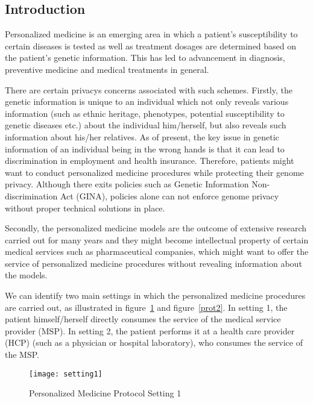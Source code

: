\documentclass[10pt,letterpaper]{article}
\begin{document}
\begin{multicols}{2} %

\section{Introduction}
Personalized medicine is an emerging area in which a patient's susceptibility to certain diseases is tested as well as treatment dosages are determined 
based on the patient's genetic information. This has led to advancement in diagnosis, preventive medicine and medical treatments in general. 

There are certain privacys concerns associated with such schemes. Firstly, the genetic information is unique to an individual which not only reveals various 
information (such as ethnic heritage, phenotypes, potential susceptibility to genetic diseases etc.) about the individual him/herself, but also reveals such
information about his/her relatives. As of present, the key issue in genetic information of an individual being in the wrong hands is that it can lead to 
discrimination in employment and health insurance. Therefore, patients might want to conduct personalized medicine procedures while
protecting their genome privacy. Although there exits policies such as Genetic Information Non-discrimination Act (GINA), policies alone 
can not enforce genome privacy without proper technical solutions in place. 

Secondly, the personalized medicine models are the outcome of extensive research carried out for many years and they might become intellectual property of 
certain medical services such as pharmaceutical companies, which might want to offer the service of personalized medicine procedures without revealing 
information about the models.

We can identify two main settings in which the personalized medicine procedures are carried out, as illustrated in figure~\ref{prot1} and figure~\ref{prot2}.
In setting 1, the patient himself/herself directly consumes the service of the medical service provider (MSP). In setting 2, the patient performs it at a 
health care provider (HCP) (such as a physician or hospital laboratory), who consumes the service of the MSP.
\begin{figure}[H]
\label{prot1}
\centering
\texttt{[image: setting1]}
\caption{Personalized Medicine Protocol Setting 1}
\end{figure}


\end{multicols}
\end{document}
